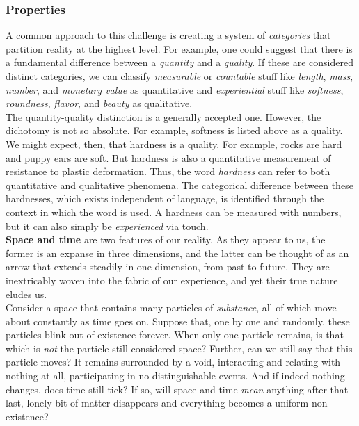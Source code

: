\subsubsection{Properties}



A common approach to this challenge is creating a system of \textit{categories} that partition reality at the highest level. For example, one could suggest that there is a fundamental difference between a \textit{quantity} and a \textit{quality}. If these are considered distinct categories, we can classify \textit{measurable} or \textit{countable} stuff like \textit{length}, \textit{mass}, \textit{number}, and \textit{monetary value} as quantitative and \textit{experiential} stuff like \textit{softness}, \textit{roundness}, \textit{flavor}, and \textit{beauty} as qualitative. \\

The quantity-quality distinction is a generally accepted one. However, the dichotomy is not so absolute. For example, softness is listed above as a quality. We might expect, then, that hardness is a quality. For example, rocks are hard and puppy ears are soft. But hardness is also a quantitative measurement of resistance to plastic deformation. Thus, the word \textit{hardness} can refer to both quantitative and qualitative phenomena. The categorical difference between these hardnesses, which exists independent of language, is identified through the context in which the word is used. A hardness can be measured with numbers, but it can also simply be \textit{experienced} via touch. \\



\textbf{Space and time} are two features of our reality. As they appear to us, the former is an expanse in three dimensions, and the latter can be thought of as an arrow that extends steadily in one dimension, from past to future. They are inextricably woven into the fabric of our experience, and yet their true nature eludes us. \\

Consider a space that contains many particles of \textit{substance}, all of which move about constantly as time goes on. Suppose that, one by one and randomly, these particles blink out of existence forever. When only one particle remains, is that which is \textit{not} the particle still considered space? Further, can we still say that this particle moves? It remains surrounded by a void, interacting and relating with nothing at all, participating in no distinguishable events. And if indeed nothing changes, does time still tick? If so, will space and time \textit{mean} anything after that last, lonely bit of matter disappears and everything becomes a uniform non-existence? \\

